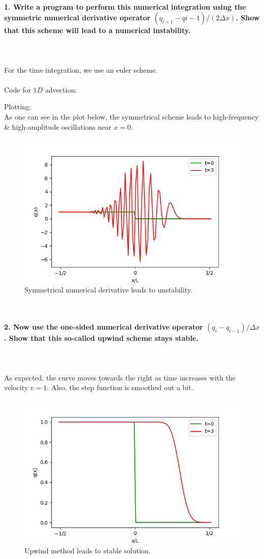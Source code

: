\paragraph{1. Write a program to perform this numerical 
    integration using the symmetric numerical derivative 
    operator $(q_{i+1}-q{i-1})/(2\Delta x)$. Show that this 
    scheme will lead to a numerical instability.
} \ \\
    \\
    For the time integration, we use 
    an euler scheme. \\
    \\
    Code for $1D$ advection:
    
    \newpage\noindent
    Plotting:
     \ \\
    As one can see in the plot below, the 
    symmetrical scheme leads to high-frequency 
    \& high-amplitude oscillations near $x=0$.
    \begin{figure}[h!]
        \centering
        \includegraphics[width=.6\textwidth]{../figures/symmetric_1.png}
        \caption{Symmetrical numerical derivative leads to unstability.}
    \end{figure} \ \\ 

\newpage
\paragraph{2. Now use the one-sided numerical derivative 
    operator $(q_i-q_{i-1})/\Delta x$. Show that this 
    so-called upwind scheme stays stable.
} \ \\
    \\
    As expected, the curve moves towards the right 
    as time increases with the velocity $v=1$. 
    Also, the step function is smoothed out a bit.
    \begin{figure}[h!]
        \centering
        \includegraphics[width=.6\textwidth]{../figures/upwind_2.png}
        \caption{Upwind method leads to stable solution.}
    \end{figure} \ \\ 

